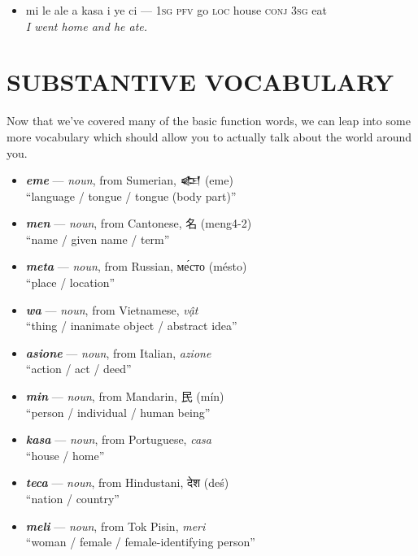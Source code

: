 \documentclass[a4paper]{article}
\begin{document}
\begin{itemize}
	\begin{itemize}
		\item mi le ale a kasa i ye ci — \textsc{1sg pfv} go \textsc{loc} house \textsc{conj 3sg} eat \\\textit{I went home and he ate.}
	\end{itemize}
\end{itemize}

\section{SUBSTANTIVE VOCABULARY}

Now that we've covered many of the basic function words, we can leap into some more vocabulary which should allow you to actually talk about the world around you.

\begin{itemize}
	\item \textbf{\textit{eme}} — \textit{noun}, from Sumerian, {\cuneiffont 𒅴} (eme) \\``language / tongue / tongue (body part)''
	\item \textbf{\textit{men}} — \textit{noun}, from Cantonese, 名 (meng4-2) \\``name / given name / term''
	\item \textbf{\textit{meta}} — \textit{noun}, from Russian, ме́сто (mésto) \\``place / location''
	\item \textbf{\textit{wa}} — \textit{noun}, from Vietnamese, \textit{vật} \\``thing / inanimate object / abstract idea''
	\item \textbf{\textit{asione}} — \textit{noun}, from Italian, \textit{azione} \\``action / act / deed''
	\item \textbf{\textit{min}} — \textit{noun}, from Mandarin, 民 (mín) \\``person / individual / human being''
	\item \textbf{\textit{kasa}} — \textit{noun}, from Portuguese, \textit{casa} \\``house / home''
	\item \textbf{\textit{teca}} — \textit{noun}, from Hindustani, {\hmfont देश} (deś) \\``nation / country''
	\item \textbf{\textit{meli}} — \textit{noun}, from Tok Pisin, \textit{meri} \\``woman / female / female-identifying person''

\end{itemize}
\end{document}
